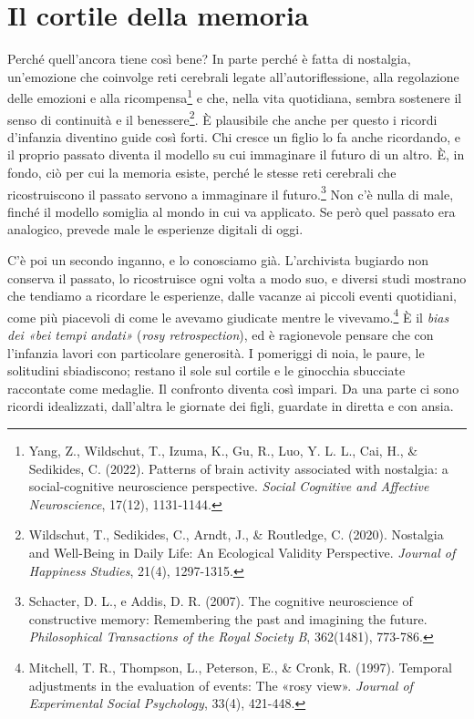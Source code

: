 \section{Il cortile della memoria}
\label{sec:p2c29-radici-psicologiche}

Perché quell'ancora tiene così bene? In parte perché è fatta di nostalgia, un'emozione che coinvolge reti cerebrali legate all'autoriflessione, alla regolazione delle emozioni e alla ricompensa\footnote{Yang, Z., Wildschut, T., Izuma, K., Gu, R., Luo, Y. L. L., Cai, H., \& Sedikides, C. (2022). Patterns of brain activity associated with nostalgia: a social-cognitive neuroscience perspective. \textit{Social Cognitive and Affective Neuroscience}, 17(12), 1131-1144.} e che, nella vita quotidiana, sembra sostenere il senso di continuità e il benessere\footnote{Wildschut, T., Sedikides, C., Arndt, J., \& Routledge, C. (2020). Nostalgia and Well-Being in Daily Life: An Ecological Validity Perspective. \textit{Journal of Happiness Studies}, 21(4), 1297-1315.}. È plausibile che anche per questo i ricordi d'infanzia diventino guide così forti. Chi cresce un figlio lo fa anche ricordando, e il proprio passato diventa il modello su cui immaginare il futuro di un altro. È, in fondo, ciò per cui la memoria esiste, perché le stesse reti cerebrali che ricostruiscono il passato servono a immaginare il futuro.\footnote{Schacter, D. L., e Addis, D. R. (2007). The cognitive neuroscience of constructive memory: Remembering the past and imagining the future. \textit{Philosophical Transactions of the Royal Society B}, 362(1481), 773-786.} Non c'è nulla di male, finché il modello somiglia al mondo in cui va applicato. Se però quel passato era analogico, prevede male le esperienze digitali di oggi.

C'è poi un secondo inganno, e lo conosciamo già. L'archivista bugiardo non conserva il passato, lo ricostruisce ogni volta a modo suo, e diversi studi mostrano che tendiamo a ricordare le esperienze, dalle vacanze ai piccoli eventi quotidiani, come più piacevoli di come le avevamo giudicate mentre le vivevamo.\footnote{Mitchell, T. R., Thompson, L., Peterson, E., \& Cronk, R. (1997). Temporal adjustments in the evaluation of events: The «rosy view». \textit{Journal of Experimental Social Psychology}, 33(4), 421-448.} È il \textit{bias dei «bei tempi andati»} (\textit{rosy retrospection}), ed è ragionevole pensare che con l'infanzia lavori con particolare generosità. I pomeriggi di noia, le paure, le solitudini sbiadiscono; restano il sole sul cortile e le ginocchia sbucciate raccontate come medaglie. Il confronto diventa così impari. Da una parte ci sono ricordi idealizzati, dall'altra le giornate dei figli, guardate in diretta e con ansia.

